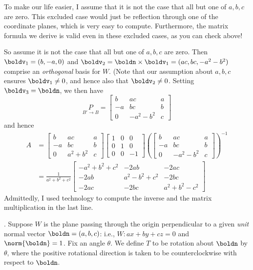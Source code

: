 \begin{solution}
To make our life easier, I assume that it is not the case that all but one of $a,b,c$ are zero. This excluded case would just be reflection through one of the coordinate planes, which is very easy to compute. Furthermore, the matrix formula we derive is valid even in these excluded cases, as you can check above! 

So assume it is not the case that all but one of $a,b,c$ are zero. Then $\boldv_1=(b,-a,0)$ and $\boldv_2=\boldn\times\boldv_1=(ac,bc,-a^2-b^2)$ comprise an {\em orthogonal} basis for $W$. (Note that our assumption about $a,b,c$ ensures $\boldv_1\ne 0$, and hence also that $\boldv_2\ne 0$. Setting $\boldv_3=\boldn$, we then have 
\[
\underset{B'\rightarrow B}{P}=\begin{bmatrix}
b&ac&a\\
-a&bc&b\\
0&-a^2-b^2&c
\end{bmatrix}
\]
and hence 
\begin{align*}
A&=\begin{bmatrix}
b&ac&a\\
-a&bc&b\\
0&a^2+b^2&c
\end{bmatrix}
\begin{bmatrix}
1&0&0\\
0&1&0\\
0&0&-1
\end{bmatrix}
\left(\begin{bmatrix}
b&ac&a\\
-a&bc&b\\
0&-a^2-b^2&c
\end{bmatrix}
\right)^{-1}\\
&=\frac{1}{a^2+b^2+c^2}\begin{bmatrix}
-a^2+b^2+c^2&-2ab&-2ac\\
-2ab&a^2-b^2+c^2&-2bc\\
-2ac&-2bc&a^2+b^2-c^2
\end{bmatrix}
\end{align*}
Admittedly, I used technology to compute the inverse and the matrix multiplication in the last line. 
\end{solution}
. Suppose $W$ is the plane passing through the origin perpendicular to a given {\em unit} normal vector $\boldn=(a,b,c)$: i.e., $W: ax+by+cz=0$ and $\norm{\boldn}=1$. Fix an angle $\theta$. We define $T$ to be rotation about $\boldn$ by $\theta$, where the positive rotational direction is taken to be counterclockwise with respect to $\boldn$. 
